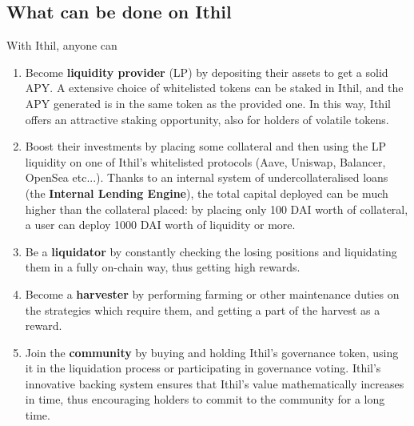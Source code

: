\documentclass[a4paper,10 pt]{article}
\theoremstyle{definition}
\begin{document}
\subsection{What can be done on Ithil}
With Ithil, anyone can
\begin{enumerate}
\item Become {\bf liquidity provider} (LP) by depositing their assets to get a solid APY. A extensive choice of whitelisted tokens can be staked in Ithil, and the APY generated is in the same token as the provided one. In this way, Ithil offers an attractive staking opportunity, also for holders of volatile tokens.
\item Boost their investments by placing some collateral and then using the LP liquidity on one of Ithil's whitelisted protocols (Aave, Uniswap, Balancer, OpenSea etc...). Thanks to an internal system of undercollateralised loans (the {\bf Internal Lending Engine}), the total capital deployed can be much higher than the collateral placed: by placing only 100 DAI worth of collateral, a user can deploy 1000 DAI worth of liquidity or more.
\item Be a {\bf liquidator} by constantly checking the losing positions and liquidating them in a fully on-chain way, thus getting high rewards.
\item Become a {\bf harvester} by performing farming or other maintenance duties on the strategies which require them, and getting a part of the harvest as a reward.
\item Join the {\bf community} by buying and holding Ithil's governance token, using it in the liquidation process or participating in governance voting. Ithil's innovative backing system ensures that Ithil's value mathematically increases in time, thus encouraging holders to commit to the community for a long time.
\end{enumerate}
\end{document}
